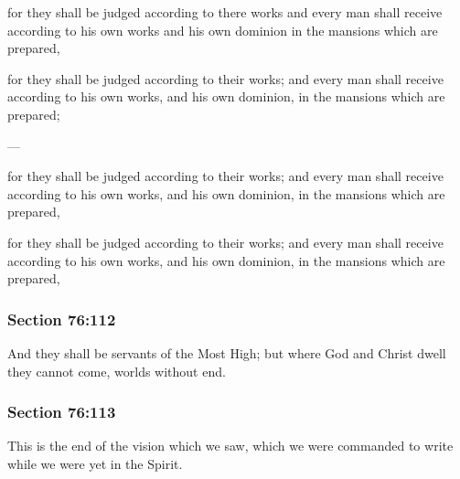 		\begin{framed}
		\scriptsize
			\begin{compactdesc}
				\item[JSP] for they shall be judged according to there works and every man shall receive according to his own works and his own dominion in the mansions which are prepared,
				\item[EMS] for they shall be judged according to their works; and every man shall receive according to his own works, and his own dominion, in the mansions which are prepared;
				\item[BC] ---
				\item[DC 1835] for they shall be judged according to their works; and every man shall receive according to his own works, and his own dominion, in the mansions which are prepared,
				\item[DC 1844] for they shall be judged according to their works; and every man shall receive according to his own works, and his own dominion, in the mansions which are prepared,
			\end{compactdesc}
		\end{framed}

	\subsubsection{Section 76:112} %
		\label{DC76-112}

		And they shall be servants of the Most High; but where God and Christ dwell they cannot come, worlds without end.


	\subsubsection{Section 76:113} %
		\label{DC76-113}

		This is the end of the vision which we saw, which we were commanded to write while we were yet in the Spirit.


